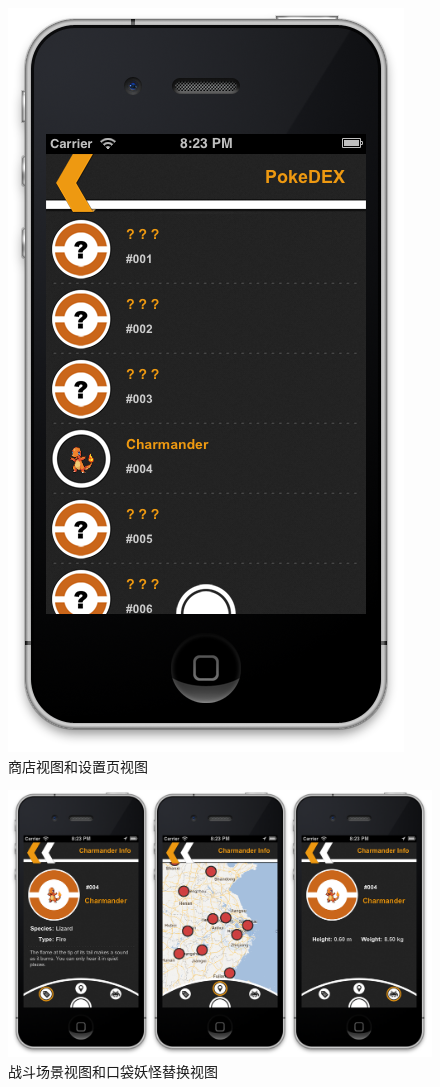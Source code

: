 \documentclass{article}
\begin{document}
\begin{CJK}{UTF8}{gbsn}
  \begin{figure}[htbp]
		\centering
		\includegraphics[bb=0 0 790 744, scale=0.45]{figure/fig_n24.png}
		\caption{商店视图和设置页视图}
		\label{fig:n24}
	\end{figure}

  \begin{figure}[htbp]
		\centering
		\includegraphics[bb=0 0 790 744, scale=0.45]{figure/fig_n25.png}
		\caption{战斗场景视图和口袋妖怪替换视图}
		\label{fig:n25}
	\end{figure}


\end{CJK}
\end{document}
